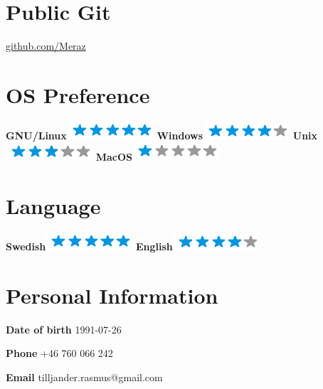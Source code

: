 \documentclass[]{friggeri-cv}
\begin{document}
\begin{aside}
     \section{Public Git}
    \href{https://github.com/Meraz}{github.com/Meraz}
    ~
    ~
  \section{OS Preference}
    \textbf{GNU/Linux}\includegraphics[scale=0.40]{img/5stars.png}
    \textbf{Windows}\includegraphics[scale=0.40]{img/4stars.png}
    \textbf{Unix}\includegraphics[scale=0.40]{img/3stars.png}
    \textbf{MacOS}\includegraphics[scale=0.40]{img/1stars.png}
    ~
    ~
 \section{Language}
    \textbf{Swedish}\includegraphics[scale=0.40]{img/5stars.png}
    \textbf{English}\includegraphics[scale=0.40]{img/4stars.png}
 ~
 ~
\end{aside}
\vspace{0.5cm}
\section{Personal Information}
\textbf{Date of birth} 1991-07-26

\textbf{Phone} +46 760 066 242

\textbf{Email} tilljander.rasmus@gmail.com
\end{document}
